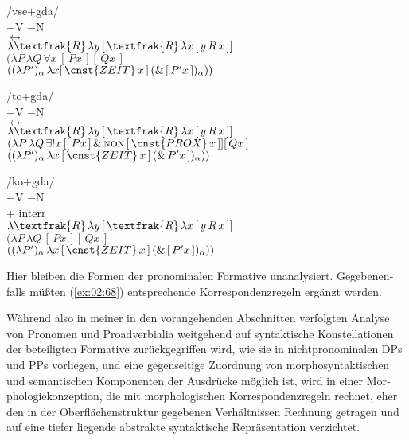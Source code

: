\documentclass[output=paper, colorlinks, citecolor=brown, booklanguage=german]{langscibook}
\begin{document}
\begin{otherlanguage}{german}
\ea\label{ex:02:69}
 /vse$+$gda/ \\
 $-$V $-$N  \\
 \hspace{7cm} $\leftrightarrow$ \\
 $\lambda \textfrak{R}\, \lambda y\, [\, \textfrak{R}\, \lambda x\, [\, y\, R\, x \,]]$ \\
 $(\lambda P\, \lambda Q\, \forall x\, [\, P x \,][\, Q x \,]$ \\
 $((\lambda P')_\alpha\, \lambda x [\, \cnst{ZEIT}\, x \,]\, (\&\, [\, P' x \,])_\alpha ))$ \\
 \vspace{1em}
 
 /to$+$gda/ \\
 $-$V $-$N \\
 \hspace{7cm} $\leftrightarrow$ \\
 $\lambda \textfrak{R}\, \lambda y\, [\, \textfrak{R}\, \lambda x\, [\, y\, R\, x \,]]$  \\
 $(\lambda P\, \lambda Q\, \exists !x\, [[\, P x \,]\, \&\, \textsc{non}\, [\, \cnst{PROX}\, x \,]][\, Q x \,]$ \\
 $((\lambda P')_\alpha\, \lambda x\, [\, \cnst{ZEIT}\, x \,]\, (\&\, P' x \,])_\alpha ))$ \\
 \vspace{1em}
 
 /ko$+$gda/ \\
 $-$V $-$N \\
 $+$ interr \\
 $\lambda \textfrak{R}\, \lambda y\, [\, \textfrak{R}\, \lambda x\, [\, y\, R\, x \,]]$ \\
 $(\lambda P\, \lambda Q\, [\, P x \,][\, Q x \,]$ \\
 $((\lambda P')_\alpha\, \lambda x\, [\, \cnst{ZEIT}\, x \,]\, (\&\, [\, P' x \,])_\alpha )) $
\z 

\largerpage
\noindent Hier bleiben die Formen der pronominalen Formative unanalysiert. Gegebenenfalls müßten (\ref{ex:02:68}) entsprechende Korrespondenzregeln ergänzt werden.

Während also in meiner in den vorangehenden Abschnitten verfolgten An\-a\-ly\-se von Pronomen und Proadverbialia weitgehend auf syntaktische Konstellationen der beteiligten Formative zurückgegriffen wird, wie sie in nichtpronominalen DPs und PPs vorliegen, und eine gegenseitige Zuordnung von morphosyntaktischen und semantischen Komponenten der Ausdrücke möglich ist, wird in einer Morphologiekonzeption, die mit morphologischen Korrespondenzregeln rechnet, eher den in der Oberflächenstruktur gegebenen Verhältnissen Rechnung getragen und auf eine tiefer liegende abstrakte syntaktische Re\-prä\-sen\-ta\-tion verzichtet.


\end{otherlanguage}
\end{document}

